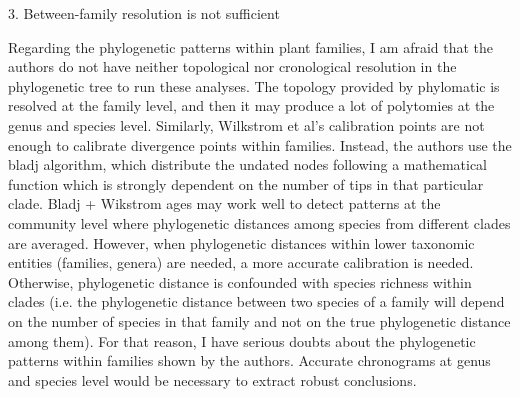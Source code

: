 \documentclass[12pt]{letter}
\newenvironment{refquote}{\bigskip \begin{it}}{\end{it}\smallskip}
\begin{document}





  3. Between-family resolution is not sufficient

    \begin{refquote}

      Regarding the phylogenetic patterns within plant families, I am afraid that the authors do not have neither topological nor cronological resolution in the phylogenetic tree to run these analyses. The topology provided by phylomatic is resolved at the family level, and then it may produce a lot of polytomies at the genus and species level. Similarly, Wilkstrom et al's calibration points are not enough to calibrate divergence points within families. Instead, the authors use the bladj algorithm, which distribute the undated nodes following a mathematical function which is strongly dependent on the number of tips in that particular clade.  Bladj + Wikstrom ages may work well to detect patterns at the community level where phylogenetic distances among species from different clades are averaged.  However, when phylogenetic distances within lower taxonomic entities (families, genera) are needed, a more accurate calibration is needed. Otherwise, phylogenetic distance is confounded with species richness within clades (i.e. the phylogenetic distance between two species of a family will depend on the  number of species in that family and not on the true phylogenetic distance among them). For that reason, I have serious doubts about the phylogenetic patterns within families shown by the authors. Accurate chronograms at genus and species level would be necessary to extract robust conclusions.

      \end{refquote}
\end{document}

